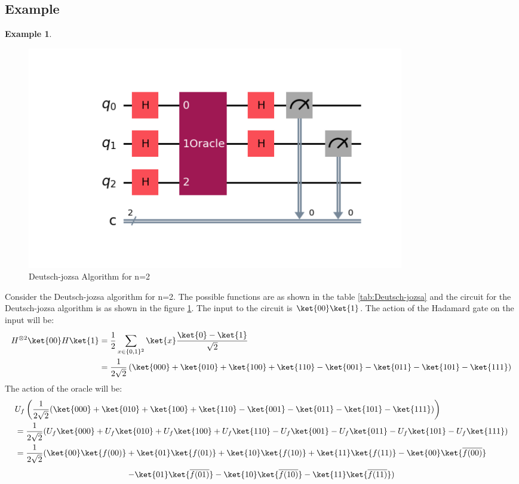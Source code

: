 \documentclass[12pt, oneside]{book}
\theoremstyle{definition}
\theoremstyle{definition}
\newtheorem{example}{Example}[section]
\theoremstyle{remark}
\begin{document}
\subsection{Example}
\begin{example}
    \begin{figure}[H]
        \centering
        \includegraphics[width=0.8\textwidth]{../images/deutsch-jozsa-algorithm.png}
        \caption{Deutsch-jozsa Algorithm for n=2}
        \label{fig:deutsch-jozsaex}
    \end{figure}
    Consider the Deutsch-jozsa algorithm for n=2. The possible functions are as shown in the table \ref{tab:Deutsch-jozsa}
    and the circuit for the Deutsch-jozsa algorithm is as shown in the figure \ref{fig:deutsch-jozsaex}. 
    The input to the circuit is $\ket{00}\ket{1}$. The action of the Hadamard gate on the input will be:
    \begin{align*}
        H^{\otimes 2}\ket{00}H\ket{1}&=\frac{1}{2}\sum_{x\in \{0,1\}^2}\ket{x}\frac{\ket{0}-\ket{1}}{\sqrt{2}} \\
        &=\frac{1}{2\sqrt{2}}\left(\ket{000}+\ket{010}+\ket{100}+\ket{110}-\ket{001}-\ket{011}-\ket{101}-\ket{111}\right)
    \end{align*}
    The action of the oracle will be:
    \begin{align*}
        &U_f\left(\frac{1}{2\sqrt{2}}(\ket{000}+\ket{010}+\ket{100}+\ket{110}-\ket{001}-\ket{011}-\ket{101}-\ket{111})\right)\\
        &=\frac{1}{2\sqrt{2}}(U_f\ket{000}+U_f\ket{010}+U_f\ket{100}+U_f\ket{110}-U_f\ket{001}-U_f\ket{011}-U_f\ket{101}-U_f\ket{111})\\
        &=\frac{1}{2\sqrt{2}}(\ket{00}\ket{f(00)}+\ket{01}\ket{f(01)}+\ket{10}\ket{f(10)}+\ket{11}\ket{f(11)}-\ket{00}\ket{\overline{f(00)}}
    \end{align*}
    \[
    -\ket{01}\ket{\overline{f(01)}}-\ket{10}\ket{\overline{f(10)}}-\ket{11}\ket{\overline{f(11)}})
\]
\end{example}
\end{document}
